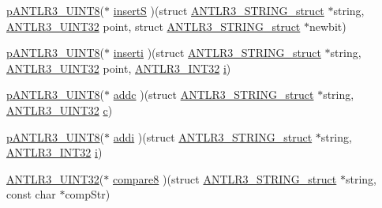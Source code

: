 \begin{DoxyCompactItemize}
\item 
\hyperlink{antlr3defs_8h_a95c800abcac5d607fd9e3e775ace78c5}{p\-A\-N\-T\-L\-R3\-\_\-\-U\-I\-N\-T8}($\ast$ \hyperlink{struct_a_n_t_l_r3___s_t_r_i_n_g__struct_a11f681cc8ecee301279fc6be4a9b22d2}{insert\-S} )(struct \hyperlink{struct_a_n_t_l_r3___s_t_r_i_n_g__struct}{A\-N\-T\-L\-R3\-\_\-\-S\-T\-R\-I\-N\-G\-\_\-struct} $\ast$string, \hyperlink{antlr3defs_8h_ac41f744abd0fd25144b9eb9d11b1dfd1}{A\-N\-T\-L\-R3\-\_\-\-U\-I\-N\-T32} point, struct \hyperlink{struct_a_n_t_l_r3___s_t_r_i_n_g__struct}{A\-N\-T\-L\-R3\-\_\-\-S\-T\-R\-I\-N\-G\-\_\-struct} $\ast$newbit)
\item 
\hyperlink{antlr3defs_8h_a95c800abcac5d607fd9e3e775ace78c5}{p\-A\-N\-T\-L\-R3\-\_\-\-U\-I\-N\-T8}($\ast$ \hyperlink{struct_a_n_t_l_r3___s_t_r_i_n_g__struct_a2a3a8531246f1852c5c2774110c41003}{inserti} )(struct \hyperlink{struct_a_n_t_l_r3___s_t_r_i_n_g__struct}{A\-N\-T\-L\-R3\-\_\-\-S\-T\-R\-I\-N\-G\-\_\-struct} $\ast$string, \hyperlink{antlr3defs_8h_ac41f744abd0fd25144b9eb9d11b1dfd1}{A\-N\-T\-L\-R3\-\_\-\-U\-I\-N\-T32} point, \hyperlink{antlr3defs_8h_a6faef5c4687f8eb633d2aefea93973ca}{A\-N\-T\-L\-R3\-\_\-\-I\-N\-T32} \hyperlink{_read_d_m3___matlab_8m_a6f6ccfcf58b31cb6412107d9d5281426}{i})
\item 
\hyperlink{antlr3defs_8h_a95c800abcac5d607fd9e3e775ace78c5}{p\-A\-N\-T\-L\-R3\-\_\-\-U\-I\-N\-T8}($\ast$ \hyperlink{struct_a_n_t_l_r3___s_t_r_i_n_g__struct_a2ce6c24a62648477f4a89106a0327622}{addc} )(struct \hyperlink{struct_a_n_t_l_r3___s_t_r_i_n_g__struct}{A\-N\-T\-L\-R3\-\_\-\-S\-T\-R\-I\-N\-G\-\_\-struct} $\ast$string, \hyperlink{antlr3defs_8h_ac41f744abd0fd25144b9eb9d11b1dfd1}{A\-N\-T\-L\-R3\-\_\-\-U\-I\-N\-T32} \hyperlink{image_sim_8m_a463b16ca2bfa2f0cbab0e62fcb263d8e}{c})
\item 
\hyperlink{antlr3defs_8h_a95c800abcac5d607fd9e3e775ace78c5}{p\-A\-N\-T\-L\-R3\-\_\-\-U\-I\-N\-T8}($\ast$ \hyperlink{struct_a_n_t_l_r3___s_t_r_i_n_g__struct_ad2bfbb32818bfce5d267923fab408655}{addi} )(struct \hyperlink{struct_a_n_t_l_r3___s_t_r_i_n_g__struct}{A\-N\-T\-L\-R3\-\_\-\-S\-T\-R\-I\-N\-G\-\_\-struct} $\ast$string, \hyperlink{antlr3defs_8h_a6faef5c4687f8eb633d2aefea93973ca}{A\-N\-T\-L\-R3\-\_\-\-I\-N\-T32} \hyperlink{_read_d_m3___matlab_8m_a6f6ccfcf58b31cb6412107d9d5281426}{i})
\item 
\hyperlink{antlr3defs_8h_ac41f744abd0fd25144b9eb9d11b1dfd1}{A\-N\-T\-L\-R3\-\_\-\-U\-I\-N\-T32}($\ast$ \hyperlink{struct_a_n_t_l_r3___s_t_r_i_n_g__struct_abcbc344902fb72ef91bb9ae3d6a39680}{compare8} )(struct \hyperlink{struct_a_n_t_l_r3___s_t_r_i_n_g__struct}{A\-N\-T\-L\-R3\-\_\-\-S\-T\-R\-I\-N\-G\-\_\-struct} $\ast$string, const char $\ast$comp\-Str)

\end{DoxyCompactItemize}
